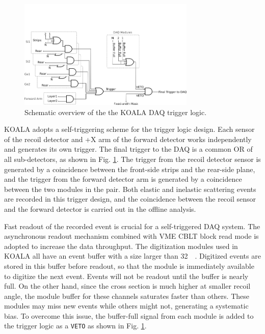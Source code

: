 \documentclass[number,5p]{elsarticle}
\begin{document}
\begin{figure}[tb!]
  \centering
  \includegraphics[width=0.75\textwidth]{./trigger_logic.png}
  \caption{Schematic overview of the the KOALA DAQ trigger logic.}
  \label{fig:trigger_logic}
\end{figure}

KOALA adopts a self-triggering scheme for the trigger logic design.
Each sensor of the recoil detector and +X arm of the forward detector works independently and generates its own trigger. 
The final trigger to the DAQ is a common OR of all sub-detectors, as shown in Fig. \ref{fig:trigger_logic}.
The trigger from the recoil detector sensor is generated by a coincidence between the front-side strips and the rear-side plane, 
and the trigger from the forward detector arm is generated by a coincidence between the two modules in the pair.
Both elastic and inelastic scattering events are recorded in this trigger
design, and the coincidence between the recoil sensor and the forward detector
is carried out in the offline analysis.

Fast readout of the recorded event is crucial for a self-triggered DAQ system.
The asynchronous readout mechanism combined with VME CBLT block read mode is adopted to increase the data throughput.
The digitization modules used in KOALA all have an event buffer with a size
larger than \SI{32}{\kibi\byte}.
Digitized events are stored in this buffer before readout, so that the module is immediately available to digitize the next event.
Events will not be readout until the buffer is nearly full.
On the other hand, since the cross section is much higher at smaller recoil
angle, the module buffer for these channels saturates faster than others.
These modules may miss new events while others might not, generating a systematic bias.
To overcome this issue, the buffer-full signal from each module is added to the
trigger logic as a \texttt{VETO} as shown in Fig. \ref{fig:trigger_logic}.
\end{document}
